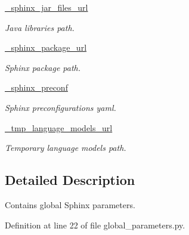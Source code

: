 \begin{DoxyCompactItemize}
\hyperlink{classrapp__speech__detection__sphinx4_1_1global__parameters_1_1GlobalParams_afcb09126b08bb8de186f3687f62ff83a}{\-\_\-sphinx\-\_\-jar\-\_\-files\-\_\-url}
\begin{DoxyCompactList}\small\item\em Java libraries path. \end{DoxyCompactList}\item 
\hyperlink{classrapp__speech__detection__sphinx4_1_1global__parameters_1_1GlobalParams_aec2fabfa84128e000d5af362d659cc95}{\-\_\-sphinx\-\_\-package\-\_\-url}
\begin{DoxyCompactList}\small\item\em Sphinx package path. \end{DoxyCompactList}\item 
\hyperlink{classrapp__speech__detection__sphinx4_1_1global__parameters_1_1GlobalParams_a7812512e88ceff516022a250a218a7c6}{\-\_\-sphinx\-\_\-preconf}
\begin{DoxyCompactList}\small\item\em Sphinx preconfigurations yaml. \end{DoxyCompactList}\item 
\hyperlink{classrapp__speech__detection__sphinx4_1_1global__parameters_1_1GlobalParams_ac21cbb95712d8873cf5c357e7006bf59}{\-\_\-tmp\-\_\-language\-\_\-models\-\_\-url}
\begin{DoxyCompactList}\small\item\em Temporary language models path. \end{DoxyCompactList}\end{DoxyCompactItemize}


\subsection{Detailed Description}
Contains global Sphinx parameters. 

Definition at line 22 of file global\-\_\-parameters.\-py.



